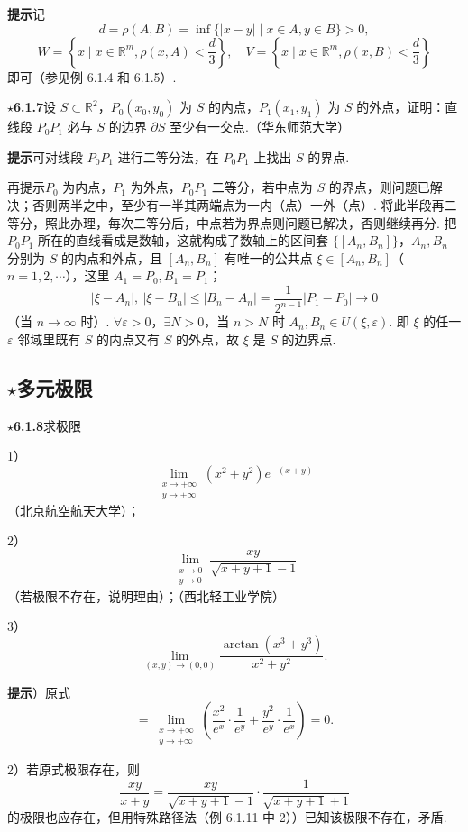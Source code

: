 \documentclass[UTF8,12pt,a4paper,fontset=fandol]{ctexart}
\begin{document}
\noindent\textbf{提示}\quad 记
\[
  d=\rho(A,B)=\inf\{|x-y|\mid x\in A,y\in B\}>0,
\]
\[
  W=\left\{x\mid x\in\mathbb{R}^m,\rho(x,A)<\frac d3\right\},\quad
  V=\left\{x\mid x\in\mathbb{R}^m,\rho(x,B)<\frac d3\right\}
\]
即可（参见例 6.1.4 和 6.1.5）.

\noindent\textbf{$\star$6.1.7}\quad 设 $S\subset\mathbb{R}^2$，$P_0(x_0,y_0)$ 为 $S$ 的内点，$P_1(x_1,y_1)$ 为 $S$ 的外点，证明：直线段 $P_0P_1$ 必与 $S$ 的边界 $\partial S$ 至少有一交点.（华东师范大学）

\noindent\textbf{提示}\quad 可对线段 $P_0P_1$ 进行二等分法，在 $P_0P_1$ 上找出 $S$ 的界点.

再提示\quad $P_0$ 为内点，$P_1$ 为外点，$P_0P_1$ 二等分，若中点为 $S$ 的界点，则问题已解决；否则两半之中，至少有一半其两端点为一内（点）一外（点）. 将此半段再二等分，照此办理，每次二等分后，中点若为界点则问题已解决，否则继续再分. 把 $P_0P_1$ 所在的直线看成是数轴，这就构成了数轴上的区间套 $\{[A_n,B_n]\}$，$A_n,B_n$ 分别为 $S$ 的内点和外点，且 $[A_n,B_n]$ 有唯一的公共点 $\xi\in[A_n,B_n]$（$n=1,2,\cdots$），这里 $A_1=P_0,B_1=P_1$；
\[
  |\xi-A_n|,\ |\xi-B_n|\le |B_n-A_n|
  =\frac1{2^{n-1}}|P_1-P_0|\to0
\]
（当 $n\to\infty$ 时）. $\forall\varepsilon>0$，$\exists N>0$，当 $n>N$ 时 $A_n,B_n\in U(\xi,\varepsilon)$. 即 $\xi$ 的任一 $\varepsilon$ 邻域里既有 $S$ 的内点又有 $S$ 的外点，故 $\xi$ 是 $S$ 的边界点.

\subsection*{$\star$多元极限}

\noindent\textbf{$\star$6.1.8}\quad 求极限

1）
\[
  \lim_{\substack{x\to+\infty\\ y\to+\infty}}(x^2+y^2)e^{-(x+y)}
\]
（北京航空航天大学）；

2）
\[
  \lim_{\substack{x\to0\\ y\to0}}\frac{xy}{\sqrt{x+y+1}-1}
\]
（若极限不存在，说明理由）；（西北轻工业学院）

3）
\[
  \lim_{(x,y)\to(0,0)}\frac{\arctan(x^3+y^3)}{x^2+y^2}.
\]

\noindent\textbf{提示}）原式
\[
  =\lim_{\substack{x\to+\infty\\ y\to+\infty}}
  \left(\frac{x^2}{e^x}\cdot\frac1{e^y}
  +\frac{y^2}{e^y}\cdot\frac1{e^x}\right)=0.
\]

2）若原式极限存在，则
\[
  \frac{xy}{x+y}
  =\frac{xy}{\sqrt{x+y+1}-1}\cdot\frac1{\sqrt{x+y+1}+1}
\]
的极限也应存在，但用特殊路径法（例 6.1.11 中 2））已知该极限不存在，矛盾.
\end{document}
